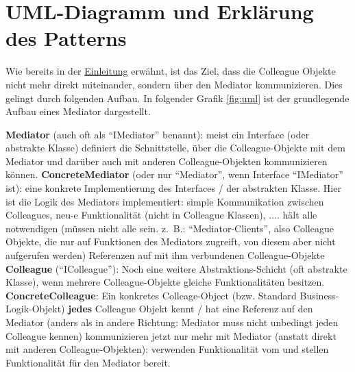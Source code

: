\chapter{UML-Diagramm und Erklärung des Patterns}
Wie bereits in der \hyperref[ref:einleitung]{Einleitung} erwähnt, ist das Ziel, dass die Colleague Objekte nicht mehr direkt miteinander, sondern über den Mediator kommunizieren. Dies gelingt durch folgenden Aufbau. In folgender Grafik \ref{fig:uml} ist der grundlegende Aufbau eines Mediator dargestellt.
\begin{outline}
    \1 \textbf{Mediator} (auch oft als \enquote{IMediator} benannt): meist ein Interface (oder abstrakte Klasse) definiert die Schnittstelle, über die Colleague-Objekte mit dem Mediator und darüber auch mit anderen Colleague-Objekten kommunizieren können.
    \1 \textbf{ConcreteMediator} (oder nur \enquote{Mediator}, wenn Interface \enquote{IMediator} ist): 
        \2 eine konkrete Implementierung des Interfaces / der abstrakten Klasse. Hier ist die Logik des Mediators implementiert: simple Kommunikation zwischen Colleagues, neu-e Funktionalität (nicht in Colleague Klassen), ....
        \2 hält alle notwendigen (müssen nicht alle sein. z. B.: \enquote{Mediator-Clients}, also Colleague Objekte, die nur auf Funktionen des Mediators zugreift, von diesem aber nicht aufgerufen werden) Referenzen auf mit ihm verbundenen Colleague-Objekte
    \1 \textbf{Colleague} (\enquote{IColleague}): Noch eine weitere Abstraktions-Schicht (oft abstrakte Klasse), wenn mehrere Colleague-Objekte gleiche Funktionalitäten besitzen. 
    \1 \textbf{ConcreteColleague}: Ein konkretes Colleage-Object (bzw. Standard Business-Logik-Objekt)
        \2 \textbf{jedes} Colleague Objekt kennt / hat eine Referenz auf den Mediator (anders als in andere Richtung: Mediator muss nicht unbedingt jeden Colleague kennen)
        \2 kommunizieren jetzt nur mehr mit Mediator (anstatt direkt mit anderen Colleague-Objekten): verwenden Funktionalität vom und stellen Funktionalität für den Mediator bereit.
\end{outline}
\autocite[vgl.][S. 273ff]{gangoffour_book}